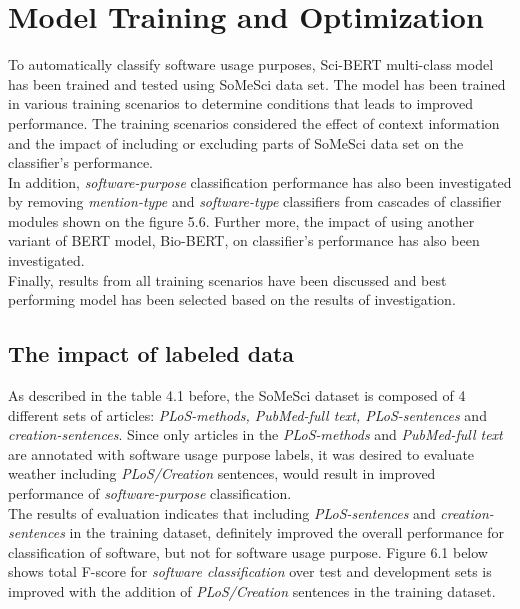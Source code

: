 \chapter{Model Training and Optimization}
\label{ch:chapter06}
 
%
%

To automatically classify software usage purposes, \ac{Sci-BERT} multi-class model has been trained and tested using \ac{SoMeSci} data set. The model has been trained in various training scenarios to determine conditions that leads to improved performance. The training scenarios considered the effect of context information  and the impact of including or excluding parts of \ac{SoMeSci} data set on the classifier’s performance.\\
 
In addition, \emph{software-purpose} classification performance has also been investigated by removing \emph{mention-type} and \emph{software-type} classifiers from cascades of classifier modules shown on the figure 5.6.  Further more, the impact of using another variant of BERT model, \ac{Bio-BERT}, on classifier’s performance  has also been investigated. \\

Finally, results from all training scenarios have been discussed and best performing model has been selected based on the results of investigation.

\section{The impact of labeled data}
\label{sec:chapter06:exclusion}

As described in the table 4.1 before, the \ac{SoMeSci} dataset is composed of 4 different sets of articles: \emph{PLoS-methods, PubMed-full text,  PLoS-sentences} and \emph{creation-sentences}. Since only articles in the  \emph{PLoS-methods} and \emph{PubMed-full text} are annotated with software usage purpose labels, it was desired to evaluate weather including \emph{PLoS/Creation} sentences, would result in improved performance of \emph{software-purpose} classification.  \\

The results of evaluation indicates that including \emph{ PLoS-sentences} and \emph{creation-sentences} in the training dataset, definitely improved the overall performance for classification of software, but not for software usage purpose. Figure 6.1 below shows total F-score for \emph{software classification} over test and development sets is improved with the addition of \emph{PLoS/Creation} sentences in the training dataset. \\


